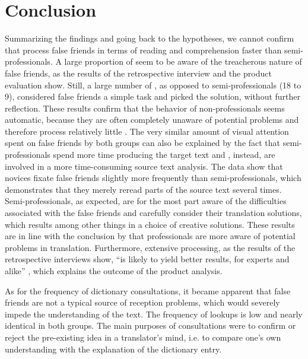 \documentclass[output=paper]{langsci/langscibook.cls}
\begin{document}
\section{Conclusion}

Summarizing the findings and going back to the hypotheses, we cannot confirm that  process false friends in terms of reading and comprehension faster than semi-professionals. A large proportion of  seem to be aware of the treacherous nature of false friends, as the results of the retrospective interview and the product evaluation show. Still, a large number of , as opposed to semi-professionals (18 to 9), considered false friends a simple task and picked the  solution, without further reflection. These results confirm that the behavior of non-professionals seems automatic, because they are often completely unaware of potential problems and therefore process relatively little \citep{Jaaskelainen1999}. The very similar amount of visual attention spent on false friends by both groups can also be explained by the fact that semi-professionals spend more time producing the target text and , instead, are involved in a more time-consuming source text analysis. The  data show that novices fixate false friends slightly more frequently than semi-professionals, which demonstrates that they merely reread parts of the source text several times. Semi-professionals, as expected, are for the most part aware of the difficulties associated with the false friends and carefully consider their translation solutions, which results among other things in a choice of creative solutions. These results are in line with the conclusion by \citet{Jonasson1998} that professionals are more aware of potential problems in translation. Furthermore, extensive processing, as the results of the retrospective interviews show, ``is likely to yield better results, for experts and  alike'' \citep[233]{Breedveld2002}, which explains the outcome of the product analysis. 

As for the frequency of dictionary consultations, it became apparent that false friends are not a typical source of reception problems, which would severely impede the understanding of the text. The frequency of lookups is low and nearly identical in both groups. The main purposes of consultations were to confirm or reject the pre-existing idea in a translator's mind, i.e. to compare one's own understanding with the explanation of the dictionary entry.
\end{document}
